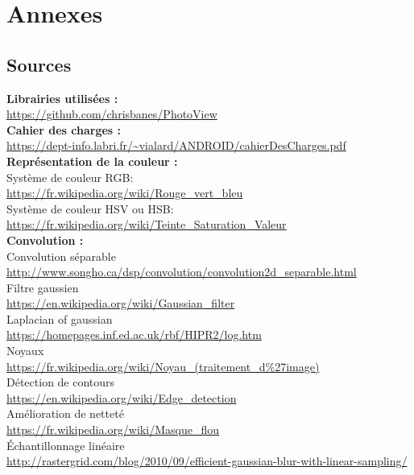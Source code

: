 \documentclass[12pt, a4paper]{article}
\begin{document}
\section{Annexes}

\subsection{Sources}

  \textbf{Librairies utilisées :}
  \\
  \url{https://github.com/chrisbanes/PhotoView}
  \\

  \textbf{Cahier des charges :}
  \\
  \url{https://dept-info.labri.fr/~vialard/ANDROID/cahierDesCharges.pdf}
  \\

  \textbf{Représentation de la couleur :}
  \\
  Système de couleur RGB:
  \\
  \url{https://fr.wikipedia.org/wiki/Rouge_vert_bleu}
  \\
  Système de couleur HSV ou HSB:
  \\
  \url{https://fr.wikipedia.org/wiki/Teinte_Saturation_Valeur}
  \\

  \textbf{Convolution :}
  \\
  Convolution séparable \label{separable_source}
  \\
  \url{http://www.songho.ca/dsp/convolution/convolution2d_separable.html}
  \\
  Filtre gaussien \label{gauss_source}
  \\
  \url{https://en.wikipedia.org/wiki/Gaussian_filter}
  \\
  Laplacian of gaussian \label{LoG}
  \\
  \url{https://homepages.inf.ed.ac.uk/rbf/HIPR2/log.htm}
  \\
  Noyaux \label{kernel_source}
  \\
  \url{https://fr.wikipedia.org/wiki/Noyau_(traitement_d%27image)}
  \\
  Détection de contours \label{edge_source}
  \\
  \url{https://en.wikipedia.org/wiki/Edge_detection}
  \\
  Amélioration de netteté \label{sharpen_source}
  \\
  \url{https://fr.wikipedia.org/wiki/Masque_flou}
  \\
  Échantillonnage linéaire \label{linear_sampling}
  \\
  \url{http://rastergrid.com/blog/2010/09/efficient-gaussian-blur-with-linear-sampling/}
  \\
  \newline
  \newline
\end{document}
